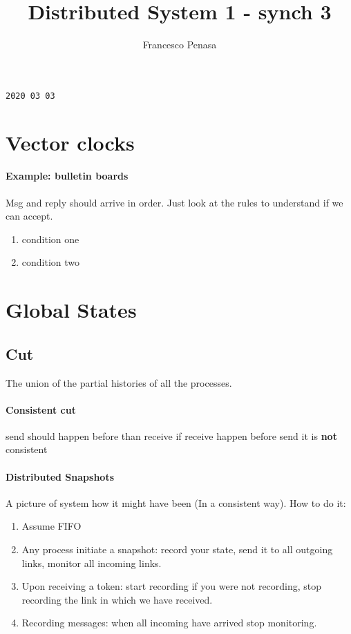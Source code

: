 \documentclass[11pt]{article}
\begin{document}
\author{Francesco Penasa}
\title{Distributed System 1 - synch 3}
\maketitle

\medskip

\texttt{2020 03 03}

\section{Vector clocks} %
\label{sec:vector_clocks}
\paragraph{Example: bulletin boards} %
\label{par:example_bulletin_boards}
Msg and reply should arrive in order.
Just look at the rules to understand if we can accept.
\begin{enumerate}
 	\item condition one
 	\item condition two
 \end{enumerate} 

\section{Global States} %
\label{sec:global_states}

\subsection{Cut} %
\label{sub:cut}
The union of the partial histories of all the processes.	
\paragraph{Consistent cut} %
\label{par:consistent_cut}
send should happen before than receive
if receive happen before send it is \textbf{not} consistent
\paragraph{Distributed Snapshots} %
\label{par:distributed_snapshots}
A picture of system how it might have been (In a consistent way).
How to do it:
\begin{enumerate}
	\item Assume FIFO
	\item Any process initiate a snapshot: record your state, send it to all outgoing links, monitor all incoming links.
	\item Upon receiving a token: start recording if you were not recording, stop recording the link in which we have received. 
	\item Recording messages: when all incoming have arrived stop monitoring.
\end{enumerate}
\end{document}
